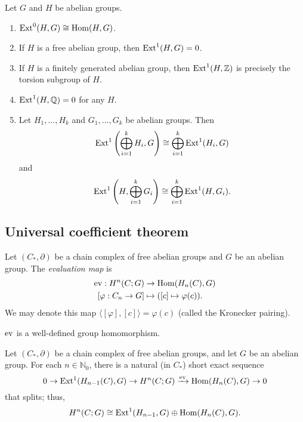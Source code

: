 \begin{proposition}
    Let $G$ and $H$ be abelian groups.
    \begin{enumerate}
        \item $\operatorname{Ext}^0(H, G) \cong \operatorname{Hom}(H, G)$.
        \item If $H$ is a free abelian group, then $\operatorname{Ext}^1(H,G) = 0$.
        \item If $H$ is a finitely generated abelian group, then $\operatorname{Ext}^1(H, \mathbb Z)$ is precisely the torsion subgroup of $H$.
        \item $\operatorname{Ext}^1(H, \mathbb Q) = 0$ for any $H$.
        \item Let $H_1, \ldots, H_k$ and $G_1, \ldots, G_k$ be abelian groups. Then
              \[ \operatorname{Ext}^1\left(\bigoplus_{i=1}^k H_i, G\right) \cong
                  \bigoplus_{i=1}^k \operatorname{Ext}^1(H_i, G) \]
              and
              \[ \operatorname{Ext}^1\left(H, \bigoplus_{i=1}^k G_i\right) \cong
                  \bigoplus_{i=1}^k \operatorname{Ext}^1(H, G_i). \]
    \end{enumerate}
\end{proposition}

\subsection{Universal coefficient theorem}

\begin{definition}
    Let $(C_*, \partial)$ be a chain complex of free abelian groups and $G$ be an abelian group. The \emph{evaluation map} is
    \begin{align*}
        \operatorname{ev}: H^n(C; G)       & \to \operatorname{Hom}(H_n(C), G)               \\
        [\varphi: C_n \to G] & \mapsto ([c] \mapsto \varphi(c)).
    \end{align*}
    We may denote this map $\langle[\varphi], [c]\rangle = \varphi(c)$ (called the Kronecker pairing).
\end{definition}

\begin{lemma}
    $\operatorname{ev}$ is a well-defined group homomorphism.
\end{lemma}

\begin{theorem}
    Let $(C_*, \partial)$ be a chain complex of free abelian groups, and let $G$ be an abelian group. For each $n \in \mathbb N_0$, there is a natural (in $C_*$) short exact sequence
    \[ 0 \to \operatorname{Ext}^1(H_{n-1}(C), G) \to H^n(C;G) \xrightarrow{\operatorname{ev}} \operatorname{Hom}(H_n(C), G) \to 0 \]
    that splits; thus,
    \[ H^n(C;G) \cong \operatorname{Ext}^1(H_{n-1}, G) \oplus \operatorname{Hom}(H_n(C), G). \]
\end{theorem}

